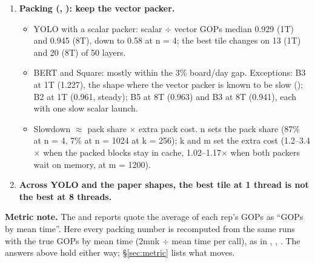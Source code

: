 \begin{enumerate}
\item \textbf{Packing (, ): keep the vector packer.}
  \begin{itemize}\setlength\itemsep{1pt}
  \item YOLO with a scalar packer: scalar $\div$ vector GOPs median 0.929 (1T) and 0.945 (8T), down to 0.58 at n = 4; the best tile changes on 13 (1T) and 20 (8T) of 50 layers.
  \item BERT and Square: mostly within the 3\% board/day gap. Exceptions: B3 at 1T (1.227), the shape where the vector packer is known to be slow (); B2 at 1T (0.961, steady); B5 at 8T (0.963) and B3 at 8T (0.941), each with one slow scalar launch.
  \item Slowdown $\approx$ pack share $\times$ extra pack cost. n sets the pack share (87\% at n = 4, 7\% at n = 1024 at k = 256); k and m set the extra cost (1.2--3.4$\times$ when the packed blocks stay in cache, 1.02--1.17$\times$ when both packers wait on memory, at m = 1200).
  \end{itemize}
\item \textbf{Across YOLO and the paper shapes, the best tile at 1 thread is not the best at 8 threads.}
\end{enumerate}

\noindent\textbf{Metric note.} The  and  reports quote the average of each rep's GOPs as ``GOPs by mean time''. Here every packing number is recomputed from the same runs with the true GOPs by mean time (2mnk $\div$ mean time per call), as in , , . The answers above hold either way; \S\ref{sec:metric} lists what moves.

